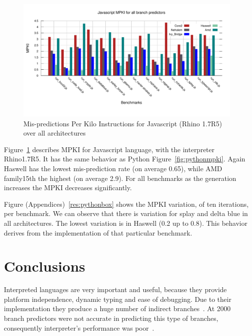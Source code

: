 \documentclass[parskip=full, paper=a4, fontsize=12pt]{scrartcl}
\numberwithin{equation}{section}
\numberwithin{figure}{section}
\numberwithin{table}{section}
\begin{document}
\begin{figure}[t]
	\centering
	\includegraphics[width=1\textwidth]{figures/javascript_MPKI.pdf}
	\caption{Mis-predictions Per Kilo Instructions for Javascript (Rhino 1.7R5) over all architectures}
	\label{fig:javascriptmpki}
\end{figure}
Figure~\ref{fig:javascriptmpki} describes MPKI for Javascript language, with the interpreter Rhino1.7R5. It has the same behavior as Python Figure~\ref{fig:pythonmpki}. Again Haswell has the lowest mis-prediction rate (on average 0.65), while AMD family15th the highest (on average 2.9). For all benchmarks as the generation increases the MPKI decreases significantly.  

Figure (Appendices)~\ref{res:pythonbox} shows the MPKI variation, of ten iterations, per benchmark. We can observe that there is variation for splay and delta blue in all architectures. The lowest variation is in Haswell (0.2 up to 0.8). This behavior derives from the implementation of that particular benchmark.    


\section{Conclusions}
Interpreted languages are very important and useful, because they provide platform independence, dynamic typing and ease of debugging. Due to their implementation they produce a huge number of indirect branches~\cite{performance_of_interpreters}. At 2000 branch predictors were not accurate in predicting this type of branches, consequently interpreter's performance was poor~\cite{performance_of_interpreters}. 
\end{document}
